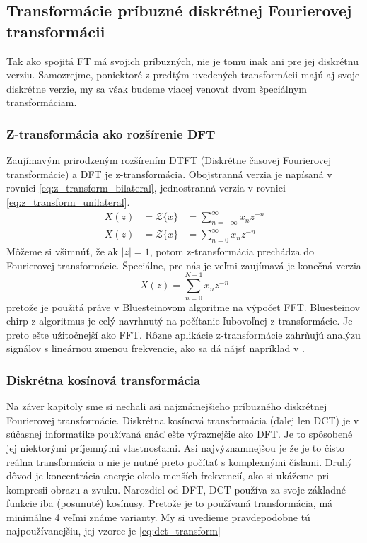 \subsection{Transformácie príbuzné diskrétnej Fourierovej
transformácii}
Tak ako spojitá FT má svojich príbuzných, nie je tomu inak ani pre jej
diskrétnu verziu. Samozrejme, poniektoré z predtým uvedených
transformácii majú aj svoje diskrétne verzie, my sa však budeme viacej
venovať dvom špeciálnym transformáciam.

\subsubsection{Z-transformácia ako rozšírenie DFT}
Zaujímavým prirodzeným rozšírením DTFT (Diskrétne časovej Fourierovej
transformácie) a DFT je z-transformácia. Obojstranná verzia je
napísaná v rovnici \ref{eq:z_transform_bilateral}, jednostranná verzia
v rovnici \ref{eq:z_transform_unilateral}.
\begin{eqnarray}
    \label{eq:z_transform_bilateral}
    X(z) &= \mathcal{Z}\{x\} &= \sum_{n=-\infty}^{\infty} x_n z^{-n} \\
    \label{eq:z_transform_unilateral}
    X(z) &= \mathcal{Z}\{x\} &= \sum_{n=0}^{\infty} x_n z^{-n}
\end{eqnarray}
Môžeme si všimnúť, že ak $|z|=1$, potom z-transformácia prechádza do
Fourierovej transformácie.
Špeciálne, pre nás je veľmi zaujímavá je konečná verzia
\begin{equation}
 X(z) = \sum_{n=0}^{N-1} x_n z^{-n}
\end{equation}
pretože je použitá práve v Bluesteinovom algoritme na výpočet FFT.
Bluesteinov chirp z-algoritmus je celý navrhnutý na počítanie
ľubovoľnej z-transformácie. Je preto ešte užitočnejší ako FFT. Rôzne
aplikácie z-transformácie zahrňujú analýzu signálov s lineárnou zmenou
frekvencie, ako sa dá nájsť napríklad v \cite{nasa}.

\subsubsection{Diskrétna kosínová transformácia}
Na záver kapitoly sme si nechali asi najznámejšieho príbuzného
diskrétnej Fourierovej transformácie. Diskrétna kosínová transformácia
(ďalej len DCT) je v súčasnej informatike používaná snáď ešte
výraznejšie ako DFT. Je to spôsobené jej niektorými príjemnými
vlastnosťami. Asi najvýznamnejšou je že je to čisto reálna
transformácia a nie je nutné preto počítať s komplexnými číslami.
Druhý dôvod je koncentrácia energie okolo menších frekvencií, ako si
ukážeme pri kompresii obrazu a zvuku.
Narozdiel od DFT, DCT používa za svoje základné funkcie iba (posunuté) kosínusy.
Pretože je to používaná transformácia, má minimálne 4 veľmi známe
varianty. My si uvedieme pravdepodobne tú najpoužívanejšiu, jej vzorec
je \ref{eq:dct_transform}

